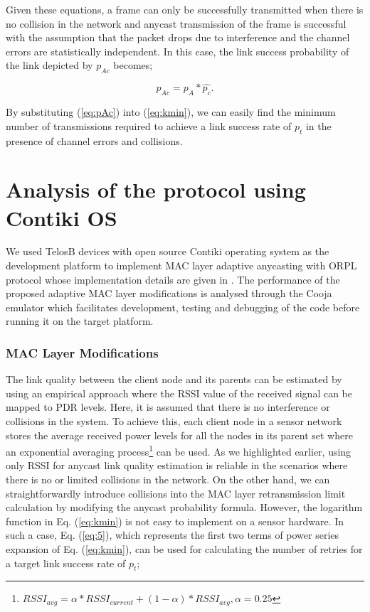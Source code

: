 \documentclass[conference]{IEEEtran}
\begin{document}
Given these equations, a frame can only be successfully transmitted when there is no collision in the network and anycast transmission of the frame is successful with the assumption that the packet drops due to interference and the channel errors are statistically independent. In this case, the link success probability of the link depicted by $p_{Ac}$ becomes;

\begin{equation}
    p_{Ac} = p_A * \hat{p_c}. \label{eq:pAc}
\end{equation}
 
By substituting (\ref{eq:pAc}) into (\ref{eq:kmin}), we can easily find the minimum number of transmissions required to achieve a link success rate of $p_t$ in the presence of channel errors and collisions.

\section{Analysis of the protocol using Contiki OS}\label{protocolImplementation}
We used TelosB \cite{telosb} devices with open source Contiki operating system as the development platform to implement MAC layer adaptive anycasting with ORPL protocol whose implementation details are given in \cite{orpl}. The performance of the proposed adaptive MAC layer modifications is analysed through the Cooja emulator \cite{contiki}  which facilitates development, testing and debugging of the code before running it on the target platform.

\subsubsection{MAC Layer Modifications}
The link quality between the client node and its parents can be estimated by using an empirical approach where the RSSI value of the received signal can be mapped to PDR levels. Here, it is assumed that there is no interference or collisions in the system. To achieve this, each client node in a sensor network stores the average received power levels for all the nodes in its parent set where an exponential averaging process\footnote{$RSSI_{avg}=\alpha*RSSI_{current} + (1-\alpha)*RSSI_{avg}, \alpha = 0.25$} can be used. As we highlighted earlier, using only RSSI for anycast link quality estimation is reliable in the scenarios where there is no or limited collisions in the network. On the other hand, we can straightforwardly introduce collisions into the MAC layer retransmission limit calculation by modifying the anycast probability formula. However, the logarithm function in Eq. (\ref{eq:kmin}) is not easy to implement on a sensor hardware. In such a case, Eq. (\ref{eq:5}),  which represents the first two terms of power series expansion of Eq. (\ref{eq:kmin}), can be used for calculating the number of retries for a target link success rate of $p_t$;
\end{document}
